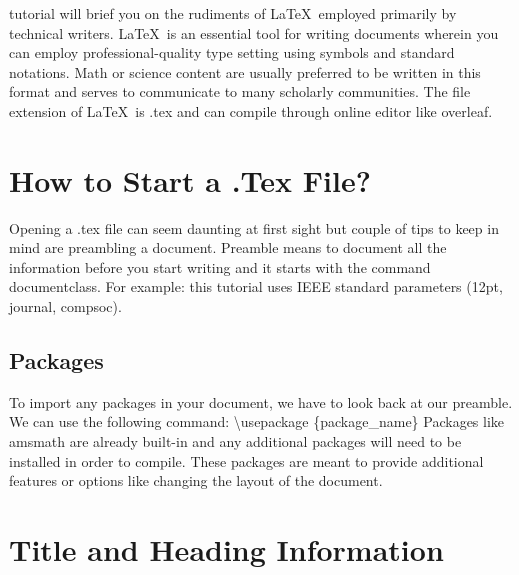 \documentclass[12pt,journal,compsoc]{IEEEtran}
\begin{document}
% 
% 
% 
% 

tutorial will brief you on the rudiments of \LaTeX\ employed primarily by technical writers. \LaTeX\ is an essential tool for writing documents wherein you can employ professional-quality type setting using symbols and standard notations. Math or science content are usually preferred to be written in this format and serves to communicate to many scholarly communities. The file extension of \LaTeX\ is .tex and can compile through online editor like overleaf. 
 
\section{How to Start a .Tex File?}
Opening a .tex file can seem daunting at first sight but couple of tips to keep in mind are preambling a document. Preamble means to document all the information before you start writing and it starts with the command \\documentclass{}.
For example: this tutorial uses IEEE standard parameters (12pt, journal, compsoc).

\subsection{Packages}
To import any packages in your document, we have to look back at our preamble.
We can use the following command: \textbackslash usepackage \{package\_name\}
Packages like amsmath are already built-in and any additional packages will need to be installed in order to compile. These packages are meant to provide additional features or options like changing the layout of the document.

\section{Title and Heading Information}
\end{document}
